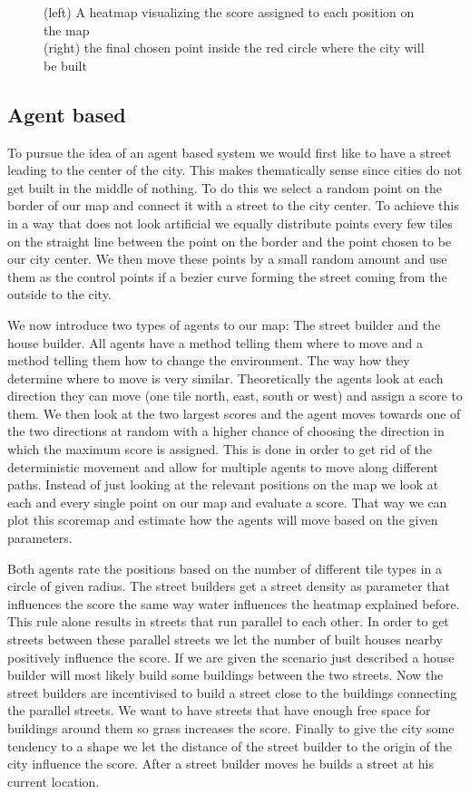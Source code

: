 \documentclass{scrartcl}
\begin{document}
\begin{figure}
  \caption{(left) A heatmap visualizing the score assigned to each position on the map\\
          (right) the final chosen point inside the red circle where the city will be built}
\end{figure}

\subsection{Agent based}
To pursue the idea of an agent based system we would first like to have a street
leading to the center of the city. This makes thematically sense since cities do not get
built in the middle of nothing. To do this we select a random point on the border
of our map and connect it with a street to the city center. To achieve this in a way
that does not look artificial we equally distribute points every few tiles on
the straight line between the point on the border and the point chosen to be our
city center. We then move these points by a small random amount and use them as the
control points if a bezier curve forming the street coming from the outside to
the city.

We now introduce two types of agents to our map: The street builder and the house builder.
All agents have a method telling them where to move and a method telling them
how to change the environment. The way how they determine where to move is very similar.
Theoretically the agents look at each direction they can move (one tile north, east, south or west)
and assign a score to them. We then look at the two largest scores and the agent
moves towards one of the two directions at random with a higher chance of choosing
the direction in which the maximum score is assigned. This is done in order to
get rid of the deterministic movement and allow for multiple agents to move along
different paths. Instead of just looking at the relevant positions on the map we
look at each and every single point on our map and evaluate a score. That way we
can plot this scoremap and estimate how the agents will move based on the given
parameters.

Both agents rate the positions based on the number of different tile types in a
circle of given radius. The street builders get a street density as parameter
that influences the score the same way water influences the heatmap explained before.
This rule alone results in streets that run parallel to each other. In order to
get streets between these parallel streets we let the number of built houses nearby
positively influence the score. If we are given the scenario just described
a house builder will most likely build some buildings between the two streets.
Now the street builders are incentivised to build a street close to the buildings
connecting the parallel streets.
We want to have streets that have enough free space for buildings around them
so grass increases the score. Finally to give the city some tendency to a shape
we let the distance of the street builder to the origin of the city influence the score.
After a street builder moves he builds a street at his current location.
\end{document}
